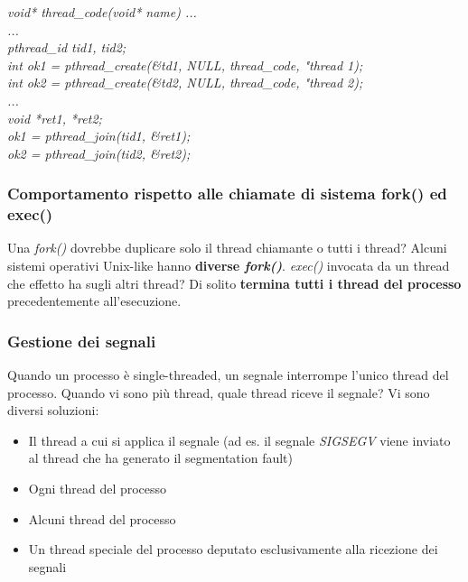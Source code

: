 \documentclass[12pt]{article}
\begin{document}
\begin{center}
    \textit{void* thread\_code(void* name) {...}} \\
    \textit{...} \\
    \textit{pthread\_id tid1, tid2;} \\
    \textit{int ok1 = pthread\_create(\textnormal{\&}td1, NULL, thread\_code, "thread 1);} \\
    \textit{int ok2 = pthread\_create(\textnormal{\&}td2, NULL, thread\_code, "thread 2);} \\
    \textit{...} \\
    \textit{void *ret1, *ret2;} \\
    \textit{ok1 = pthread\_join(tid1, \textnormal{\&}ret1);} \\
    \textit{ok2 = pthread\_join(tid2, \textnormal{\&}ret2);}
\end{center}
\newpage
\subsubsection{Comportamento rispetto alle chiamate di sistema fork() ed exec()}
Una \textit{fork()} dovrebbe duplicare solo il thread chiamante o tutti i thread? Alcuni sistemi operativi Unix-like hanno
\textbf{diverse \textit{fork()}}.\newline
\textit{exec()} invocata da un thread che effetto ha sugli altri thread? Di solito \textbf{termina tutti i thread del processo} precedentemente
all'esecuzione.
\subsubsection{Gestione dei segnali}
Quando un processo è single-threaded, un segnale interrompe l'unico thread del processo.
Quando vi sono più thread, quale thread riceve il segnale? Vi sono diversi soluzioni:
\begin{itemize}
    \item Il thread a cui si applica il segnale (ad es. il segnale \textit{SIGSEGV} viene inviato al thread che ha generato il segmentation fault)
    \item Ogni thread del processo
    \item Alcuni thread del processo
    \item Un thread speciale del processo deputato esclusivamente alla ricezione dei segnali
\end{itemize}
\end{document}
